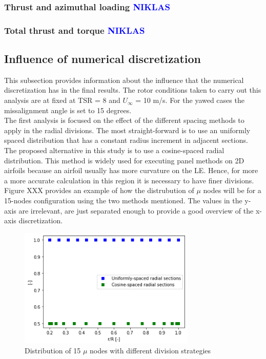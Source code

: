 \subsubsection{Thrust and azimuthal loading \textcolor{blue}{NIKLAS}}

\subsubsection{Total thrust and torque \textcolor{blue}{NIKLAS}}

\subsection{\textbf{Influence of numerical discretization} }

This subsection provides information about the influence that the numerical discretization has in the final results. The rotor conditions taken to carry out this analysis are at fixed at TSR = 8 and $U_{\infty} $ = 10 m/s. For the yawed cases the missalignment angle is set to 15 degrees. \\

The first analysis is focused on the effect of the different spacing methods to apply in the radial divisions. The most straight-forward is to use an uniformly spaced distribution that has a constant radius increment in adjacent sections. The proposed alternative in this study is to use a cosine-spaced radial distribution. This method is widely used for executing panel methods on 2D airfoils because an airfoil usually has more curvature on the LE. Hence, for more a more accurate calculation in this region it is necessary to have finer divisions. Figure XXX provides an example of how the distrubution of $\mu$ nodes will be for a 15-nodes configuration using the two methods mentioned. The values in the y-axis are irrelevant, are just separated enough to provide a good overview of the x-axis discretization. 

\begin{figure}[htbp]
\includegraphics[width=0.75\textwidth]{./img/ex_cos_plt.png}
\caption{Distribution of 15 $\mu$ nodes with different division strategies }
\centering
\label{mu_nodes}
\end{figure}

